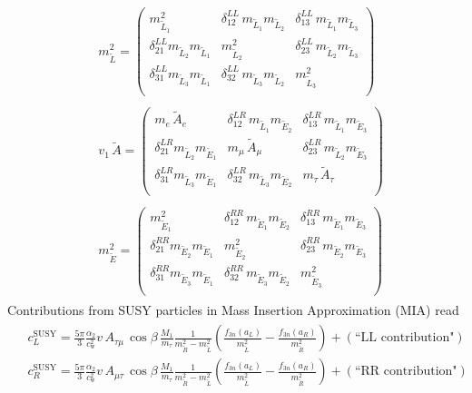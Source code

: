 \documentclass[10pt]{article}
\begin{document}
\begin{eqnarray}
\label{no19}
\begin{aligned}
& m_{\tilde{L}}^2 = \left(
\begin{matrix}
m_{\tilde{L}_1}^2 & \delta_{12}^{LL} \, m_{\tilde{L}_1} m_{\tilde{L}_2} & \delta_{13}^{LL} \, m_{\tilde{L}_1} m_{\tilde{L}_3} \\
\delta_{21}^{LL} m_{\tilde{L}_2} m_{\tilde{L}_1} & m_{\tilde{L}_2}^2 & \delta_{23}^{LL} \, m_{\tilde{L}_2} m_{\tilde{L}_3} \\
\delta_{31}^{LL} m_{\tilde{L}_3} m_{\tilde{L}_1} & \delta_{32}^{LL} \, m_{\tilde{L}_3} m_{\tilde{L}_2} & m_{\tilde{L}_3}^2 \\
\end{matrix}
\right)
\\
\\
& v_1 \, \tilde{A} = \left(
\begin{matrix}
m_e \, \tilde{A}_e & \delta_{12}^{LR} \, m_{\tilde{L}_1} m_{\tilde{E}_2} & \delta_{13}^{LR} \, m_{\tilde{L}_1} m_{\tilde{E}_3} \\
\delta_{21}^{LR} m_{\tilde{L}_2} m_{\tilde{E}_1} & m_{\mu} \, \tilde{A}_{\mu} & \delta_{23}^{LR} \, m_{\tilde{L}_2} m_{\tilde{E}_3} \\
\delta_{31}^{LR} m_{\tilde{L}_3} m_{\tilde{E}_1} & \delta_{32}^{LR} \, m_{\tilde{L}_3} m_{\tilde{E}_2} & m_{\tau} \, \tilde{A}_{\tau} \\
\end{matrix}
\right)
\\
\\
& m_{\tilde{E}}^2 = \left(
\begin{matrix}
m_{\tilde{E}_1}^2 & \delta_{12}^{RR} \, m_{\tilde{E}_1} m_{\tilde{E}_2} & \delta_{13}^{RR} \, m_{\tilde{E}_1} m_{\tilde{E}_3} \\
\delta_{21}^{RR} m_{\tilde{E}_2} m_{\tilde{E}_1} & m_{\tilde{E}_2}^2 & \delta_{23}^{RR} \, m_{\tilde{E}_2} m_{\tilde{E}_3} \\
\delta_{31}^{RR} m_{\tilde{E}_3} m_{\tilde{E}_1} & \delta_{32}^{RR} \, m_{\tilde{E}_3} m_{\tilde{E}_2} & m_{\tilde{E}_3}^2 \\
\end{matrix}
\right)
\end{aligned}
\end{eqnarray}
Contributions from SUSY particles in Mass Insertion Approximation (MIA) read \cite{Heinemeyer,Paradisi}
\begin{eqnarray}
\label{1loopsusy}
\begin{aligned}
& c_{L}^{\text{SUSY}}= \frac{5\pi}{3} \frac{\alpha_2}{c_{\text{w}}^2} v \,  A_{\tau \mu} \, \cos \beta \, \frac{M_1}{m_{\tau}} \frac{1}{m_{\tilde{R}}^2-m_{\tilde{L}}^2} \left(\frac{f_{3n}(a_L)}{m_{\tilde{L}}^2}-\frac{f_{3n}(a_R)}{m_{\tilde{R}}^2}\right) + \scriptstyle(\text{``LL contribution"}) \\
& c_{R}^{\text{SUSY}}= \frac{5\pi}{3} \frac{\alpha_2}{c_{\text{w}}^2} v \,  A_{\mu \tau} \, \cos \beta \, \frac{M_1}{m_{\tau}} \frac{1}{m_{\tilde{R}}^2-m_{\tilde{L}}^2} \left(\frac{f_{3n}(a_L)}{m_{\tilde{L}}^2}-\frac{f_{3n}(a_R)}{m_{\tilde{R}}^2}\right) + \scriptstyle(\text{``RR contribution"})
\end{aligned}
\end{eqnarray}
\end{document}
